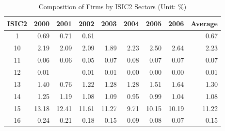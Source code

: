 \begin{table}[]
\begin{center}
\caption{Composition of Firms by ISIC2 Sectors (Unit: \%)}
\label{NumFirm_ISIC2}
\begin{tabular}{crrrrrrrr}
\hline
ISIC2 & \multicolumn{1}{c}{2000} & \multicolumn{1}{c}{2001} & \multicolumn{1}{c}{2002} & \multicolumn{1}{c}{2003} & \multicolumn{1}{c}{2004} & \multicolumn{1}{c}{2005} & \multicolumn{1}{c}{2006} & \multicolumn{1}{c}{Average} \\ \hline
1     & 0.69                     & 0.71                     & 0.61                     &                          &                          &                          &                          & 0.67                        \\
10    & 2.19                     & 2.09                     & 2.09                     & 1.89                     & 2.23                     & 2.50                     & 2.64                     & 2.23                        \\
11    & 0.06                     & 0.06                     & 0.05                     & 0.07                     & 0.08                     & 0.07                     & 0.07                     & 0.07                        \\
12    & 0.01                     &                          & 0.01                     & 0.01                     & 0.00                     & 0.00                     & 0.00                     & 0.01                        \\
13    & 1.40                     & 0.76                     & 1.22                     & 1.28                     & 1.28                     & 1.51                     & 1.64                     & 1.30                        \\
14    & 1.25                     & 1.19                     & 1.08                     & 1.09                     & 0.95                     & 0.99                     & 1.04                     & 1.08                        \\
15    & 13.18                    & 12.41                    & 11.61                    & 11.27                    & 9.71                     & 10.15                    & 10.19                    & 11.22                       \\
16    & 0.24                     & 0.21                     & 0.18                     & 0.15                     & 0.09                     & 0.08                     & 0.07                     & 0.15                        \\

\end{tabular}
\end{center}
\end{table}
